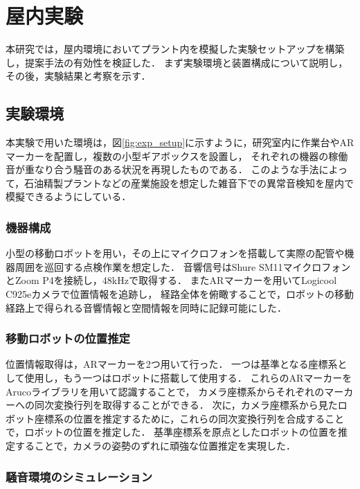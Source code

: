 \documentclass[../main]{subfiles}
\begin{document}
\section{屋内実験} \label{sec:vexp_spectral-reflectance}

本研究では，屋内環境においてプラント内を模擬した実験セットアップを構築し，提案手法の有効性を検証した．
まず実験環境と装置構成について説明し，その後，実験結果と考察を示す．

\subsection{実験環境} \label{subsec:vexp_ref_environmet}

本実験で用いた環境は，図\ref{fig:exp_setup}に示すように，研究室内に作業台やARマーカーを配置し，複数の小型ギアボックスを設置し，
それぞれの機器の稼働音が重なり合う騒音のある状況を再現したものである．
このような手法によって，石油精製プラントなどの産業施設を想定した雑音下での異常音検知を屋内で模擬できるようにしている．

\subsubsection{機器構成} \label{subsubsec:device_config}

小型の移動ロボットを用い，その上にマイクロフォンを搭載して実際の配管や機器周囲を巡回する点検作業を想定した．
音響信号はShure SM11マイクロフォンとZoom P4を接続し，48kHzで取得する．
またARマーカーを用いてLogicool C925eカメラで位置情報を追跡し，
経路全体を俯瞰することで，ロボットの移動経路上で得られる音響情報と空間情報を同時に記録可能にした．

\subsubsection{移動ロボットの位置推定}
位置情報取得は，ARマーカーを2つ用いて行った．
一つは基準となる座標系として使用し，もう一つはロボットに搭載して使用する．
これらのARマーカーをArucoライブラリを用いて認識することで，
カメラ座標系からそれぞれのマーカーへの同次変換行列を取得することができる．
次に，カメラ座標系から見たロボット座標系の位置を推定するために，これらの同次変換行列を合成することで，ロボットの位置を推定した．
基準座標系を原点としたロボットの位置を推定することで，カメラの姿勢のずれに頑強な位置推定を実現した．
\subsubsection{騒音環境のシミュレーション} \label{subsubsec:noise_simulation}
\end{document}
